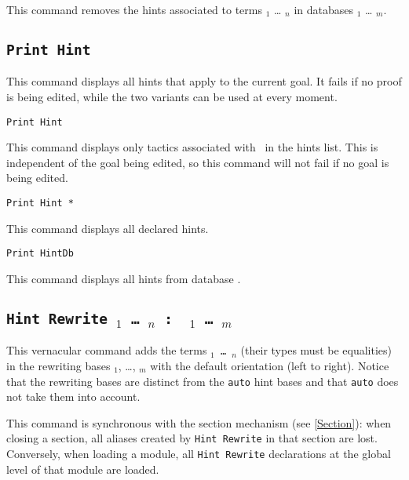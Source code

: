 \begin{coq_example*}
This command removes the hints associated to terms \term$_1$ \mbox{\dots}
\term$_n$ in databases \ident$_1$ \mbox{\dots} \ident$_m$.

\subsection{\tt Print Hint}
\label{PrintHint}

This command displays all hints that apply to the current goal. It
fails if no proof is being edited, while the two variants can be used at
every moment.

\begin{Variants}

\item {\tt Print Hint \ident}

 This command displays only tactics associated with \ident\ in the
 hints list. This is independent of the goal being edited, so this
 command will not fail if no goal is being edited.

\item {\tt Print Hint *}

  This command displays all declared hints.

\item {\tt Print HintDb \ident}
\label{PrintHintDb}

 This command displays all hints from database \ident.

\end{Variants}

\subsection{\tt Hint Rewrite \term$_1$ \mbox{\dots} \term$_n$ :~ \ident$_1$ \mbox{\dots} \ident$_m$}
\label{HintRewrite}

This vernacular command adds the terms {\tt \term$_1$ \mbox{\dots} \term$_n$}
(their types must be equalities) in the rewriting bases \ident$_1$, \dots, \ident$_m$
with the default orientation (left to right). Notice that the
rewriting bases are distinct from the {\tt auto} hint bases and that
{\tt auto} does not take them into account.

This command is synchronous with the section mechanism (see \ref{Section}):
when closing a section, all aliases created by \texttt{Hint Rewrite} in that
section are lost. Conversely, when loading a module, all \texttt{Hint Rewrite}
declarations at the global level of that module are loaded.


\end{coq_example*}
